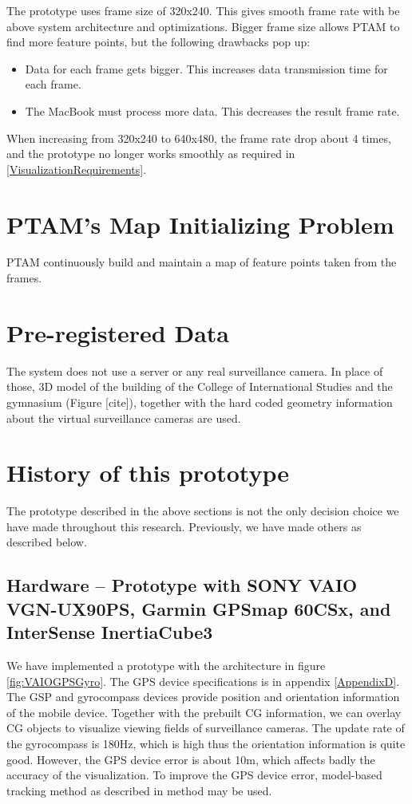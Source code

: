 The prototype uses frame size of 320x240. This gives smooth frame rate with be above system architecture and optimizations. Bigger frame size allows PTAM to find more feature points, but the following drawbacks pop up:

\begin{itemize}
	\item Data for each frame gets bigger. This increases data transmission time for each frame.
	\item The MacBook must process more data. This decreases the result frame rate.
\end{itemize}

When increasing from 320x240 to 640x480, the frame rate drop about 4 times, and the prototype no longer works smoothly as required in \ref{VisualizationRequirements}. 

\section{PTAM's Map Initializing Problem}

PTAM continuously build and maintain a map of feature points taken from the frames.

\section{Pre-registered Data}

The system does not use a server or any real surveillance camera. In place of those, 3D model of the building of the College of International Studies and the gymnasium (Figure [cite]), together with the hard coded geometry information about the virtual surveillance cameras are used.

\section{History of this prototype}

The prototype described in the above sections is not the only decision choice we have made throughout this research. Previously, we have made others as described below.

\subsection{Hardware -- Prototype with SONY VAIO VGN-UX90PS, Garmin GPSmap 60CSx, and InterSense InertiaCube3}

We have implemented a prototype with the architecture in figure \ref{fig:VAIOGPSGyro}. The GPS device specifications is in appendix \ref{AppendixD}. The GSP and gyrocompass devices provide position and orientation information of the mobile device. Together with the prebuilt CG information, we can overlay CG objects to visualize viewing fields of surveillance cameras. The update rate of the gyrocompass is 180Hz, which is high thus the orientation information is quite good. However, the GPS device error is about 10m, which affects badly the accuracy of the visualization. To improve the GPS device error, model-based tracking method as described in \citep{Reference13} method may be used.


